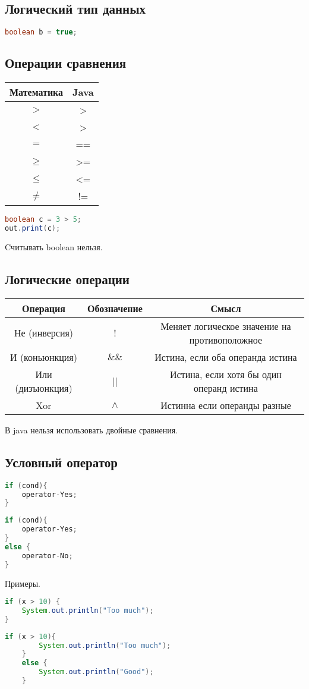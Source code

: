 \documentclass{article}
\begin{document}
\subsection{Логический тип данных}
\begin{lstlisting}[language=Java] 
boolean b = true; 
\end{lstlisting} 
\subsection{Операции сравнения}
\begin{tabular}
    {c | c}
    Математика & Java \\
    \hline
    $>$ & >\\
    $<$ & >\\
    $=$ & == \\
    $\ge $ & >=\\
    $\le $ & <=\\
    $\neq$ & !=\\
\end{tabular}
\begin{lstlisting}[language=Java] 
boolean c = 3 > 5;
out.print(c);
\end{lstlisting} 
Cчитывать boolean нельзя.
\subsection{Логические операции}
\begin{tabular}
    {|c | c | c |}
    \hline
    Операция & Обозначение & Смысл  \\
    \hline
    Не (инверсия) & ! & Меняет логическое значение на противоположное \\
    \hline
    И (коньюнкция) & $\&\&$ & Истина, если оба операнда истина \\
    \hline
    Или (дизъюнкция) & || & Истина, если хотя бы один операнд истина \\
    \hline
    Xor & $\land$ & Истинна если операнды разные \\
    \hline
\end{tabular}
В java нельзя использовать двойные сравнения.
\subsection{Условный оператор}
\begin{lstlisting}[language=Java] 
if (cond){
    operator-Yes;
} 
\end{lstlisting} 
\begin{lstlisting}[language=Java] 
if (cond){
    operator-Yes;
}
else {
    operator-No;
}
\end{lstlisting} 
Примеры.
\begin{lstlisting}[language=Java] 
if (x > 10) {
    System.out.println("Too much");
} 
\end{lstlisting} 
\begin{lstlisting}[language=Java] 
    if (x > 10){
        System.out.println("Too much");
    } 
    else {
        System.out.println("Good");
    }
\end{lstlisting} 
\end{document}

